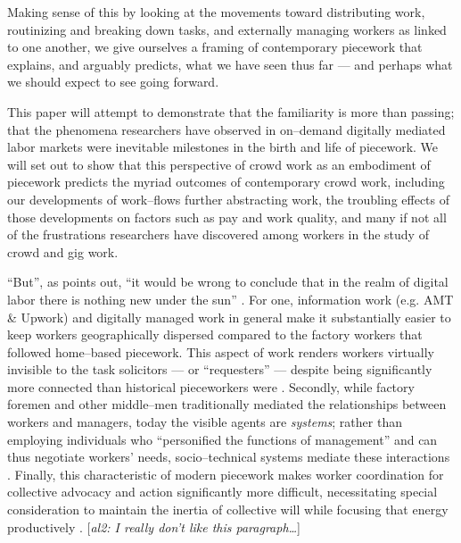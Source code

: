 \documentclass{sigchi}
\newcommand{\ali}[1]{{\color{BrickRed}[\textit{al2: #1}]}}
\begin{document}
Making sense of this 
by looking at the movements toward
distributing work,
routinizing and breaking down tasks,
and externally managing workers
as linked to one another, 
we give ourselves a framing of contemporary piecework that explains,
and arguably predicts,
what we have seen thus far
--- and perhaps what we should expect to see going forward.

This paper will attempt to demonstrate that the familiarity is more than passing;
that the phenomena researchers have observed in on--demand digitally mediated labor markets
were inevitable milestones in the birth and life of piecework.
We will set out to show that this perspective of crowd work as an embodiment of piecework
predicts the myriad outcomes of contemporary crowd work, including
our developments of work--flows further abstracting work,
the troubling effects of those developments on factors such as pay and work quality, and
many if not all of the frustrations researchers have discovered among workers
in the study of crowd and gig work.

``But'',
as \citeauthor{scholz2012digital} points out,
``it would be wrong to conclude that
in the realm of digital labor there is nothing new under the sun''
\cite{scholz2012digital}.
For one, information work
(e.g. AMT \& Upwork)
and digitally managed work in general make it substantially easier
to keep workers geographically dispersed
compared to the factory workers that followed home--based piecework.
This aspect of work renders workers virtually invisible to the task solicitors
--- or ``requesters'' ---
despite being significantly more connected than historical pieceworkers were %
\cite{turkopticon}.
Secondly, while
factory foremen and other middle--men
traditionally mediated the relationships between workers and managers,
today the visible agents are \textit{systems};
rather than employing individuals who ``personified the functions of management''
and can thus negotiate workers' needs,
socio--technical systems mediate these interactions %
\cite{wray1949marginal}.
Finally, this characteristic of modern piecework makes
worker coordination for collective advocacy and action significantly more difficult,
necessitating special consideration to maintain the inertia of collective will
while focusing that energy productively
\cite{dynamo}.
\ali{I really don't like this paragraph\dots}
\end{document}
